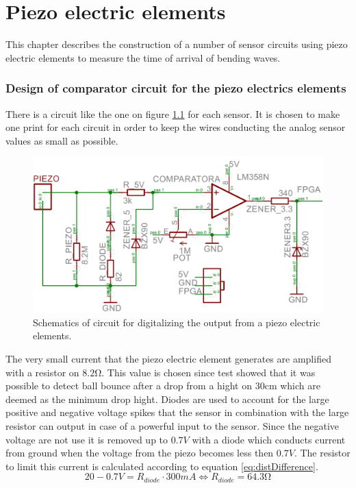 \chapter{Piezo electric elements} %
\label{cha:electronics}
This chapter describes the construction of a number of sensor circuits using piezo electric elements to measure the time of arrival of bending waves.
%
\subsection{Design of comparator circuit for the piezo electrics elements}
There is a circuit like the one on figure \ref{fig:print} for each sensor. It is chosen to make one print for each circuit in order to keep the wires conducting the analog sensor values as small as possible. 
\begin{figure}[htb]
	\centering
	\includegraphics[width=.8\textwidth]{figures/Print}
	\caption{Schematics of circuit for digitalizing the output from a piezo electric elements.}
	\label{fig:print}
\end{figure}
The very small current that the piezo electric element generates are amplified with a resistor on $8.2\si{\ohm}$. This value is chosen since test showed that it was possible to detect ball bounce after a drop from a hight on $30\si{\centi\meter}$ which are deemed as the minimum drop hight.
Diodes are used to account for the large positive and negative voltage spikes that the sensor in combination with the large resistor can output in case of a powerful input to the sensor. 
Since the negative voltage are not use it is removed up to $0.7V$ with a diode which conducts current from ground when the voltage from the piezo becomes less then $0.7V$.
The resistor to limit this current is calculated according to equation \ref{eq:distDifference}.
\begin{equation}
20 - 0.7 V = R_{diode} \cdot 300mA \Leftrightarrow R_{diode} = 64.3\si{\ohm}
\label{diodeResistor}
\end{equation}
